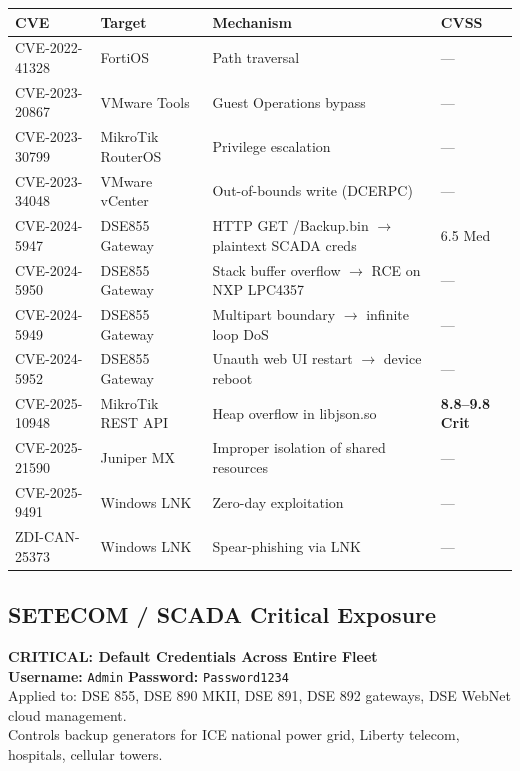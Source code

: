 \documentclass[11pt,a4paper]{article}
\begin{document}
\begin{longtable}{p{2.8cm}p{2.5cm}p{5cm}p{2.5cm}}
\toprule
\textbf{CVE} & \textbf{Target} & \textbf{Mechanism} & \textbf{CVSS} \\
\midrule
\endhead
CVE-2022-41328 & FortiOS & Path traversal & — \\
CVE-2023-20867 & VMware Tools & Guest Operations bypass & — \\
CVE-2023-30799 & MikroTik RouterOS & Privilege escalation & — \\
CVE-2023-34048 & VMware vCenter & Out-of-bounds write (DCERPC) & — \\
CVE-2024-5947 & DSE855 Gateway & HTTP GET /Backup.bin $\rightarrow$ plaintext SCADA creds & 6.5 Med \\
CVE-2024-5950 & DSE855 Gateway & Stack buffer overflow $\rightarrow$ RCE on NXP LPC4357 & — \\
CVE-2024-5949 & DSE855 Gateway & Multipart boundary $\rightarrow$ infinite loop DoS & — \\
CVE-2024-5952 & DSE855 Gateway & Unauth web UI restart $\rightarrow$ device reboot & — \\
\rowcolor{lightgray}
CVE-2025-10948 & MikroTik REST API & Heap overflow in libjson.so & \textcolor{critred}{\textbf{8.8--9.8 Crit}} \\
CVE-2025-21590 & Juniper MX & Improper isolation of shared resources & — \\
CVE-2025-9491 & Windows LNK & Zero-day exploitation & — \\
ZDI-CAN-25373 & Windows LNK & Spear-phishing via LNK & — \\
\bottomrule
\end{longtable}

\subsection{SETECOM / SCADA Critical Exposure}

\begin{center}
\colorbox{critred!10}{
\begin{minipage}{0.9\textwidth}
\vspace{0.5em}
\textbf{\textcolor{critred}{CRITICAL: Default Credentials Across Entire Fleet}}\\[0.3em]
\textbf{Username:} \texttt{Admin} \hspace{2cm} \textbf{Password:} \texttt{Password1234}\\[0.3em]
Applied to: DSE 855, DSE 890 MKII, DSE 891, DSE 892 gateways, DSE WebNet cloud management.\\
Controls backup generators for ICE national power grid, Liberty telecom, hospitals, cellular towers.
\vspace{0.5em}
\end{minipage}
}
\end{center}
\end{document}
